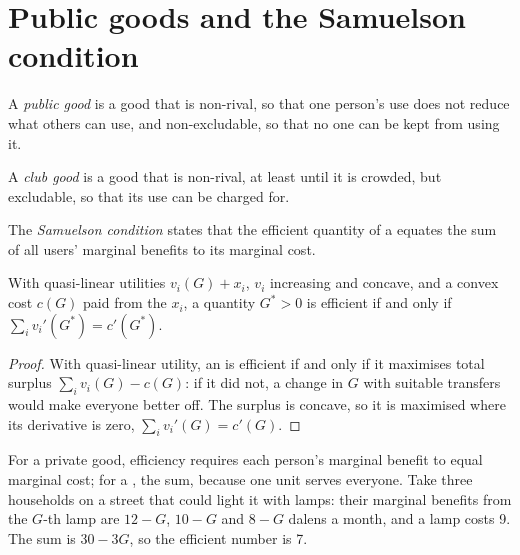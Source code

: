 \section{Public goods and the Samuelson condition}\label{sec:b2:externalities-and-public-goods-theory:samuelson}

\begin{definition}\label{def:b2:externalities-and-public-goods-theory:public-good}
A \emph{public good} is a good that is non-rival, so that one person's use does not reduce what
others can use, and non-excludable, so that no one can be kept from using it.
\end{definition}

\begin{definition}\label{def:b2:externalities-and-public-goods-theory:club-good}
A \emph{club good} is a good that is non-rival, at least until it is crowded, but excludable, so that
its use can be charged for.
\end{definition}

\begin{definition}\label{def:b2:externalities-and-public-goods-theory:samuelson}
The \emph{Samuelson condition} states that the efficient quantity of a  equates
the sum of all users' marginal benefits to its marginal cost.
\end{definition}

\begin{proposition}\label{prop:b2:externalities-and-public-goods-theory:samuelson}
With quasi-linear utilities $v_i(G) + x_i$, $v_i$ increasing and concave, and a convex cost $c(G)$ paid from the $x_i$, a quantity $G^* > 0$ is
efficient if and only if $\sum_i v_i'(G^*) = c'(G^*)$.
\end{proposition}

\begin{proof}
With quasi-linear utility, an  is efficient if and only if it maximises total surplus $\sum_i v_i(G) - c(G)$: if it did not,
a change in $G$ with suitable transfers would make everyone better off. The surplus is concave, so it is maximised where
its derivative is zero, $\sum_i v_i'(G) = c'(G)$.
\end{proof}

For a private good, efficiency requires each person's marginal benefit to equal marginal cost; for a , the
sum, because one unit serves everyone. Take three households on a street that could light it with lamps: their marginal
benefits from the $G$-th lamp are $12 - G$, $10 - G$ and $8 - G$ dalens a month, and a lamp costs 9. The sum is $30 - 3G$, so the efficient
number is 7.

